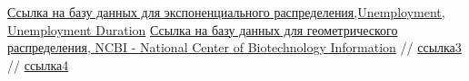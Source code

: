 \documentclass[a4paper,12pt, oneside]{book}
\begin{document}
\begin{thebibliography}{99}
	 \href{https://vincentarelbundock.github.io/Rdatasets/datasets.html}{Ссылка на базу данных для экспоненциального распределения,Unemployment,  Unemployment Duration}
	  \href{https://www.ncbi.nlm.nih.gov/nuccore/NC_024460.2?report=fasta&from=10460803&to=10470316}{Ссылка на базу данных для геометрического распределения, NCBI - National Center of Biotechnology Information}
	  // \href{http://www.ams.jhu.edu/~dan/550.435/notes/COURSENOTES435.pdf}{ссылка3}
	  // \href{http://www.obzh.ru/nad/4-3.html}{ссылка4}
\end{thebibliography}
\end{document}
